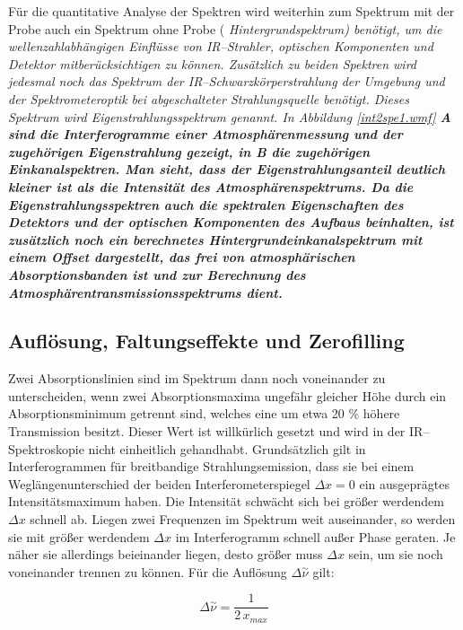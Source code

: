 Für die quantitative Analyse der Spektren wird weiterhin zum
Spektrum mit der Probe auch ein Spektrum ohne Probe (\it
Hintergrundspektrum\rm ) benötigt, um die wellenzahlabhängigen
Einflüsse von IR--Strahler, optischen Komponenten und Detektor
mitberücksichtigen zu können. Zusätzlich zu beiden Spektren wird
jedesmal noch das Spektrum der IR--Schwarzkörperstrahlung der
Umgebung und der Spektrometeroptik bei abgeschalteter
Strahlungsquelle benötigt. Dieses Spektrum wird \it
Eigenstrahlungsspektrum \rm genannt. In Abbildung
\ref{int2spe1.wmf} \bf A \rm sind die Interferogramme einer
Atmosphärenmessung und der zugehörigen Eigenstrahlung gezeigt, in
\bf B \rm die zugehörigen Einkanalspektren. Man sieht, dass der
Eigenstrahlungsanteil deutlich kleiner ist als die Intensität des
Atmosphärenspektrums. Da die Eigenstrahlungsspektren auch die
spektralen Eigenschaften des Detektors und der optischen
Komponenten des Aufbaus beinhalten, ist zusätzlich noch ein
berechnetes Hintergrundeinkanalspektrum mit einem Offset
dargestellt, das frei von atmosphärischen Absorptionsbanden ist
und zur Berechnung des Atmosphärentransmissionsspektrums dient.\\


\subsection{\label{faltung}Auflösung, Faltungseffekte und Zerofilling}

Zwei Absorptionslinien sind im Spektrum dann noch voneinander zu
unterscheiden, wenn zwei Absorptionsmaxima ungefähr gleicher Höhe
durch ein Absorptionsminimum getrennt sind, welches eine um etwa
20 \% höhere Transmission besitzt. Dieser Wert ist willkürlich
gesetzt und wird in der IR--Spektroskopie nicht einheitlich
gehandhabt. Grundsätzlich gilt in Interferogrammen für
breitbandige Strahlungsemission, dass sie bei einem
Weglängenunterschied der beiden Interferometerspiegel $\Delta x=0$
ein ausgeprägtes Intensitätsmaximum haben. Die Intensität schwächt
sich bei grö{\ss}er werdendem $\Delta x$ schnell ab. Liegen zwei
Frequenzen im Spektrum weit auseinander, so werden sie mit grö{\ss}er
werdendem $\Delta x$ im Interferogramm schnell au{\ss}er Phase
geraten. Je näher sie allerdings beieinander liegen, desto grö{\ss}er
muss $\Delta x$ sein, um sie noch voneinander trennen zu können.
Für die Auflösung $\Delta \stackrel{\sim}{\nu}$ gilt:

\begin{equation}\label{eqaufl}
  \Delta \stackrel{\sim}{\nu} = \frac{1}{2\,x_{max}}
\end{equation}

